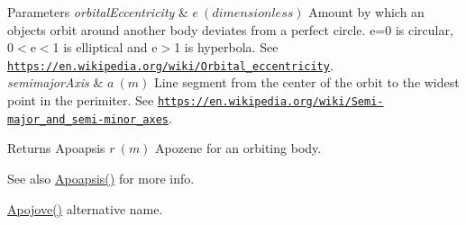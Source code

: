 \begin{DoxyParams}{Parameters}
{\em orbital\+Eccentricity} & $ e\ (dimensionless)$ Amount by which an objects orbit around another body deviates from a perfect circle. e=0 is circular, 0$<$e$<$1 is elliptical and e$>$1 is hyperbola. See \href{https://en.wikipedia.org/wiki/Orbital_eccentricity}{\tt https\+://en.\+wikipedia.\+org/wiki/\+Orbital\+\_\+eccentricity}. \\
\hline
{\em semimajor\+Axis} & $ a\ (m)$ Line segment from the center of the orbit to the widest point in the perimiter. See \href{https://en.wikipedia.org/wiki/Semi-major_and_semi-minor_axes}{\tt https\+://en.\+wikipedia.\+org/wiki/\+Semi-\/major\+\_\+and\+\_\+semi-\/minor\+\_\+axes}. \\
\hline
\end{DoxyParams}
\begin{DoxyReturn}{Returns}
Apoapsis $ r\ (m)$ Apozene for an orbiting body. 
\end{DoxyReturn}
\begin{DoxySeeAlso}{See also}
\mbox{\hyperlink{group___e_g_x_phys-_apoapsis_gaf962e650bf84a568458e8eb39b1c61ba}{Apoapsis()}} for more info. 

\mbox{\hyperlink{group___e_g_x_phys-_apoapsis_ga5a45d0a873514113aaa0adc95aefbbde}{Apojove()}} alternative name. 
\end{DoxySeeAlso}
